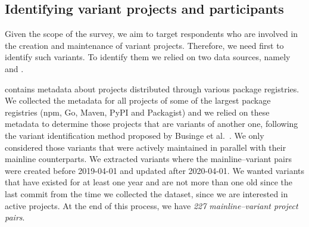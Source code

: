 \subsection{Identifying variant projects and participants}
\label{sec:forks_and_participants}

Given the scope of the survey, we aim to target respondents who are involved in the creation and maintenance of variant projects.%
Therefore, we need first to identify such variants.
To identify them we relied on two data sources, namely \librariesio and \gh.

\librariesio contains metadata about projects distributed through various package registries. We collected the metadata for all projects of some of the largest package registries (\textsf{npm, Go, Maven, PyPI} and \textsf{Packagist}) and we relied on these metadata to determine those projects that are variants of another one, following the variant identification method proposed by  Businge et al.~\cite{businge:emse:2021,businge:benevol:2020}. %
We only considered those variants that were actively maintained in parallel with their mainline counterparts. We extracted variants where the mainline--variant pairs were created before 2019-04-01 and updated after 2020-04-01. We wanted variants that have existed for at least one year and are not more than one old since the last commit from the time we collected the dataset, since we are interested in active projects.
At the end of this process, we have \textit{227 mainline–variant project pairs}.

